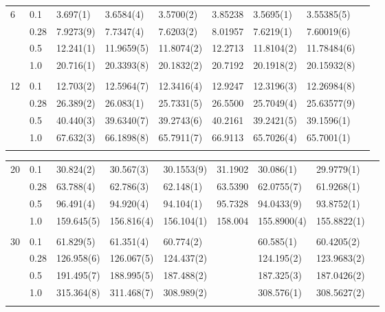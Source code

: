 {\begin{landscape}
\begin{table}
\begin{tabularx}{\hsize}{llR{2.65cm}R{2.65cm}R{2.65cm}R{2.65cm}R{2.65cm}R{2.65cm}R{2.65cm}}
		6 & 0.1 & 3.697(1) & 3.6584(4) & 3.5700(2) & 3.85238 & 3.5695(1) & 3.55385(5) \\ 
		& 0.28 & 7.9273(9) & 7.7347(4) & 7.6203(2) & 8.01957 & 7.6219(1) & 7.60019(6) \\
		& 0.5 & 12.241(1) & 11.9659(5) & 11.8074(2) & 12.2713 & 11.8104(2) & 11.78484(6) \\
		& 1.0 & 20.716(1) & 20.3393(8) & 20.1832(2) & 20.7192 & 20.1918(2) & 20.15932(8) \\ \hdashline \\
		
		12 & 0.1 & 12.703(2) & 12.5964(7) & 12.3416(4) & 12.9247 & 12.3196(3) & 12.26984(8) \\ 
		& 0.28 & 26.389(2) & 26.083(1) & 25.7331(5) & 26.5500 & 25.7049(4) & 25.63577(9) \\
		& 0.5 & 40.440(3) & 39.6340(7) & 39.2743(6) & 40.2161 & 39.2421(5) & 39.1596(1) \\
		& 1.0 & 67.632(3) & 66.1898(8) & 65.7911(7) & 66.9113 & 65.7026(4) & 65.7001(1) \\ \hdashline
	\end{tabularx}
\end{table}

\begin{table}
	\begin{tabularx}{\hsize}{llR{2.65cm}R{2.65cm}R{2.65cm}R{2.65cm}R{2.65cm}R{2.65cm}R{2.65cm}} \\
		\label{tab:quantumdotswinteraction2D2}
		20 & 0.1 & 30.824(2) & 30.567(3) & 30.1553(9) & 31.1902 & 30.086(1) & 29.9779(1) \\ 
		& 0.28 & 63.788(4) & 62.786(3) & 62.148(1) & 63.5390 & 62.0755(7) & 61.9268(1) \\
		& 0.5 & 96.491(4) & 94.920(4) & 94.104(1) & 95.7328 & 94.0433(9) & 93.8752(1) \\
		& 1.0 & 159.645(5) & 156.816(4) & 156.104(1) & 158.004 & 155.8900(4) & 155.8822(1) & \phantom{=} \\ \hdashline \\
		
		30 & 0.1 & 61.829(5) & 61.351(4) & 60.774(2) & & 60.585(1) & 60.4205(2) \\ 
		& 0.28 & 126.958(6) & 126.067(5) & 124.437(2) & & 124.195(2) & 123.9683(2) \\
		& 0.5 & 191.495(7) & 188.995(5) & 187.488(2) & & 187.325(3) & 187.0426(2) \\
		& 1.0 & 315.364(8) & 311.468(7) & 308.989(2) & & 308.576(1) & 308.5627(2) \\ \hdashline \\
		

\end{tabularx}
\end{table}
\end{landscape}}
